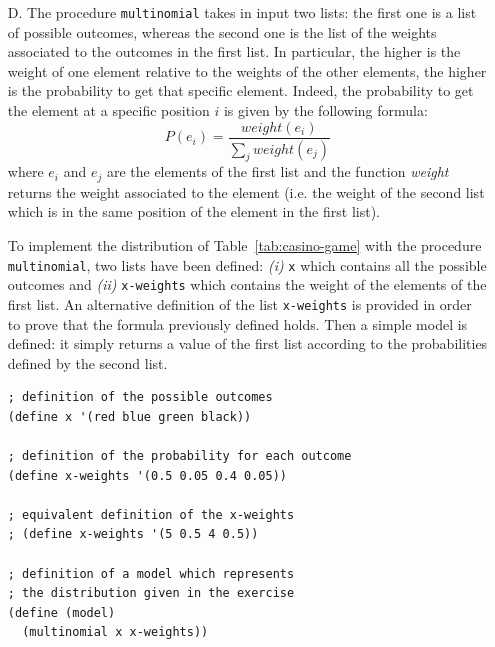 \begin{itemize}
    \item[D.] The procedure \texttt{multinomial} takes in input two lists: the first one is a list of possible outcomes, whereas the 
        second one is the list of the weights associated to the outcomes in the first list. In particular, the higher is the weight
        of one element relative to the weights of the other elements, the higher is the probability to get that specific
        element. Indeed, the probability to get the element at a specific position $i$ is given by the following formula:
        \[ P(e_{i}) = \frac{weight(e_{i})}{\sum_{j} weight(e_{j})} \]
        where $e_{i}$ and $e_{j}$ are the elements of the first list and the function \textit{weight} returns the weight associated
        to the element (i.e. the weight of the second list which is in the same position of the element in the first list).

        To implement the distribution of Table~\ref{tab:casino-game} with the procedure \texttt{multinomial}, two lists have been
        defined: \textit{(i)} \texttt{x} which contains all the possible outcomes and \textit{(ii)} \texttt{x-weights} which contains
        the weight of the elements of the first list. An alternative definition of the list \texttt{x-weights} is provided in order to
        prove that the formula previously defined holds.
        Then a simple model is defined: it simply returns a value of the first list according to the probabilities defined by the
        second list.
        \begin{lstlisting}[caption={Program which implements with \texttt{multinomial} the distribution of Table~\ref{tab:casino-game}}, 
            captionpos=b, label={lst:casino-game-d}]
; definition of the possible outcomes
(define x '(red blue green black))

; definition of the probability for each outcome
(define x-weights '(0.5 0.05 0.4 0.05))

; equivalent definition of the x-weights
; (define x-weights '(5 0.5 4 0.5))

; definition of a model which represents 
; the distribution given in the exercise
(define (model)
  (multinomial x x-weights))


\end{lstlisting}
\end{itemize}
